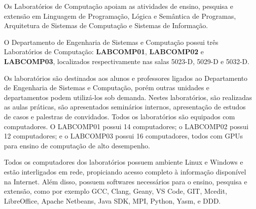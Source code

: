 Os Laboratórios de Computação apoiam as atividades de ensino, pesquisa e extensão em Linguagem de Programação, Lógica e Semântica de Programas, Arquitetura de Sistemas de Computação e Sistemas de Informação.

O Departamento de Engenharia de Sistemas e Computação possui três Laboratórios de Computação: \textbf{LABCOMP01}, \textbf{LABCOMP02} e \textbf{LABCOMP03},  localizados respectivamente nas salas 5023-D, 5029-D e 5032-D.

Os laboratórios são destinados aos alunos e professores ligados ao Departamento de Engenharia de Sistemas e Computação, porém outras unidades e departamentos podem utilizá-los sob demanda. Nestes laboratórios, são realizadas as aulas práticas, são apresentados seminários internos, apresentação de estudos de casos e palestras de convidados. Todos os laboratórios são equipados com computadores. O  LABCOMP01 possui 14 computadores; o LABCOMP02 possui 12 computadores; e o LABCOMP03 possui 16 computadores, todos com GPUs para ensino de computação de alto desempenho.


Todos os computadores dos laboratórios possuem ambiente Linux e Windows e estão interligados em rede, propiciando acesso completo à informação disponível na Internet. Além disso, possuem softwares necessários para o ensino, pesquisa e extensão, como por exemplo GCC,
Clang,
Geany,
VS Code,
GIT,
Mcedit,
LibreOffice,
Apache Netbeans,
Java SDK,
MPI, 
Python, 
Yasm, e
DDD.

